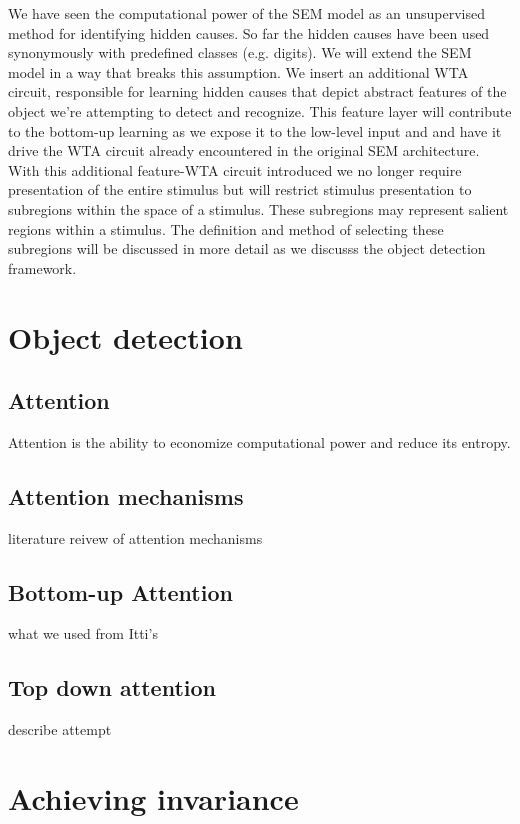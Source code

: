 \documentclass{report}%
\begin{document}
We have seen the computational power of the SEM model as an unsupervised method for identifying hidden causes. So far the hidden causes have been used synonymously with predefined classes (e.g. digits\cite{LeCun1998}). We will extend the SEM model in a way that breaks this assumption. We insert an additional WTA circuit, responsible for learning hidden causes that depict abstract features of the object we're attempting to detect and recognize. This feature layer will contribute to the bottom-up learning as we expose it to the low-level input and and have it drive the WTA circuit already encountered in the original SEM architecture. With this additional feature-WTA circuit introduced we no longer require presentation of the entire stimulus but will restrict stimulus presentation to subregions within the space of a stimulus. These subregions may represent salient regions within a stimulus. The definition and method of selecting these subregions will be discussed in more detail as we discusss the object detection framework.

\chapter{Object detection}

\section{Attention}

Attention is the ability to economize computational power and reduce its entropy. 

\section{Attention mechanisms}

literature reivew of attention mechanisms

\section{Bottom-up Attention}

what we used from Itti's

\section{Top down attention}

describe attempt

\chapter{Achieving invariance}
\end{document}
